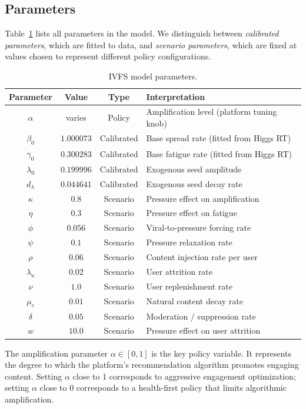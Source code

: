 \documentclass[11pt]{article}
\begin{document}
\subsection{Parameters}

Table~\ref{tab:params} lists all parameters in the model. We distinguish between \emph{calibrated parameters}, which are fitted to data, and \emph{scenario parameters}, which are fixed at values chosen to represent different policy configurations.

\begin{table}[htbp]
\centering
\caption{IVFS model parameters.}
\label{tab:params}
\begin{tabular}{cccl}
\toprule
Parameter & Value & Type & Interpretation \\
\midrule
$\alpha$ & varies & Policy & Amplification level (platform tuning knob) \\
$\beta_0$ & $1.000073$ & Calibrated & Base spread rate (fitted from Higgs RT) \\
$\gamma_0$ & $0.300283$ & Calibrated & Base fatigue rate (fitted from Higgs RT) \\
$\lambda_0$ & $0.199996$ & Calibrated & Exogenous seed amplitude \\
$d_\lambda$ & $0.044641$ & Calibrated & Exogenous seed decay rate \\
$\kappa$ & $0.8$ & Scenario & Pressure effect on amplification \\
$\eta$ & $0.3$ & Scenario & Pressure effect on fatigue \\
$\phi$ & $0.056$ & Scenario & Viral-to-pressure forcing rate \\
$\psi$ & $0.1$ & Scenario & Pressure relaxation rate \\
$\rho$ & $0.06$ & Scenario & Content injection rate per user \\
$\lambda_u$ & $0.02$ & Scenario & User attrition rate \\
$\nu$ & $1.0$ & Scenario & User replenishment rate \\
$\mu_c$ & $0.01$ & Scenario & Natural content decay rate \\
$\delta$ & $0.05$ & Scenario & Moderation / suppression rate \\
$w$ & $10.0$ & Scenario & Pressure effect on user attrition \\
\bottomrule
\end{tabular}
\end{table}

The amplification parameter $\alpha \in [0,1]$ is the key policy variable. It represents the degree to which the platform's recommendation algorithm promotes engaging content. Setting $\alpha$ close to 1 corresponds to aggressive engagement optimization; setting $\alpha$ close to 0 corresponds to a health-first policy that limits algorithmic amplification.
\end{document}
